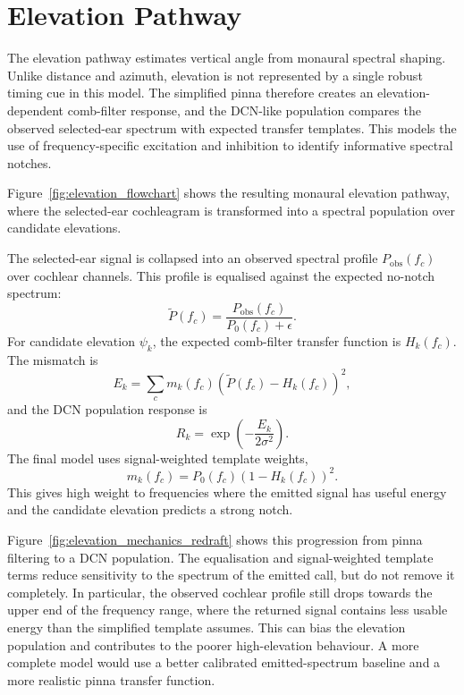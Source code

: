 \section{Elevation Pathway}

The elevation pathway estimates vertical angle from monaural spectral shaping. Unlike distance and azimuth, elevation is not represented by a single robust timing cue in this model. The simplified pinna therefore creates an elevation-dependent comb-filter response, and the DCN-like population compares the observed selected-ear spectrum with expected transfer templates. This models the use of frequency-specific excitation and inhibition to identify informative spectral notches.



Figure~\ref{fig:elevation_flowchart} shows the resulting monaural elevation pathway, where the selected-ear cochleagram is transformed into a spectral population over candidate elevations.

The selected-ear signal is collapsed into an observed spectral profile $P_{\mathrm{obs}}(f_c)$ over cochlear channels. This profile is equalised against the expected no-notch spectrum:
\begin{equation}
    \tilde{P}(f_c)
    =
    \frac{P_{\mathrm{obs}}(f_c)}{P_0(f_c)+\epsilon}.
\end{equation}
For candidate elevation $\psi_k$, the expected comb-filter transfer function is $H_k(f_c)$. The mismatch is
\begin{equation}
    E_k
    =
    \sum_c
    m_k(f_c)
    \left(\tilde{P}(f_c)-H_k(f_c)\right)^2,
\end{equation}
and the DCN population response is
\begin{equation}
    R_k
    =
    \exp\left(-\frac{E_k}{2\sigma^2}\right).
\end{equation}
The final model uses signal-weighted template weights,
\begin{equation}
    m_k(f_c)=P_0(f_c)(1-H_k(f_c))^2.
\end{equation}
This gives high weight to frequencies where the emitted signal has useful energy and the candidate elevation predicts a strong notch.

Figure~\ref{fig:elevation_mechanics_redraft} shows this progression from pinna filtering to a DCN population. The equalisation and signal-weighted template terms reduce sensitivity to the spectrum of the emitted call, but do not remove it completely. In particular, the observed cochlear profile still drops towards the upper end of the frequency range, where the returned signal contains less usable energy than the simplified template assumes. This can bias the elevation population and contributes to the poorer high-elevation behaviour. A more complete model would use a better calibrated emitted-spectrum baseline and a more realistic pinna transfer function.

